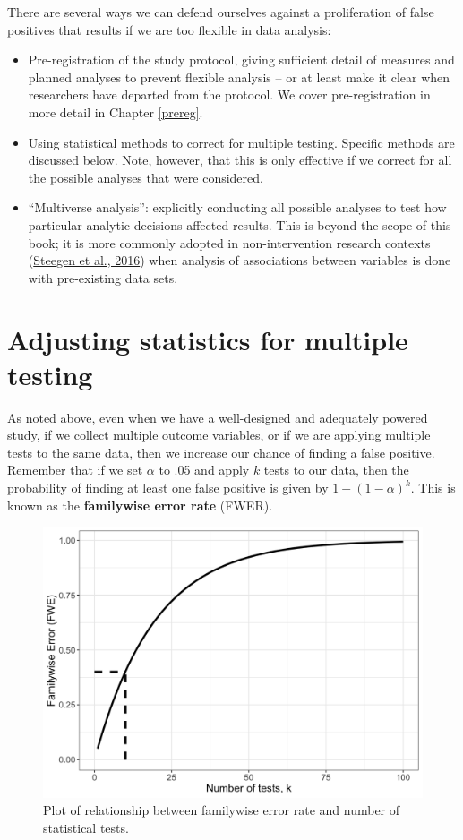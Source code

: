 \documentclass{krantz}
\begin{document}
There are several ways we can defend ourselves against a proliferation of false positives that results if we are too flexible in data analysis:

\begin{itemize}
\item
  Pre-registration of the study protocol, giving sufficient detail of measures and planned analyses to prevent flexible analysis -- or at least make it clear when researchers have departed from the protocol. We cover pre-registration in more detail in Chapter \ref{prereg}.
\item
  Using statistical methods to correct for multiple testing. Specific methods are discussed below. Note, however, that this is only effective if we correct for all the possible analyses that were considered.
\item
  ``Multiverse analysis'': explicitly conducting all possible analyses to test how particular analytic decisions affected results. This is beyond the scope of this book; it is more commonly adopted in non-intervention research contexts (\protect\hyperlink{ref-steegen2016}{Steegen et al., 2016}) when analysis of associations between variables is done with pre-existing data sets.
\end{itemize}

\hypertarget{adjusting-statistics-for-multiple-testing}{%
\section{Adjusting statistics for multiple testing}\label{adjusting-statistics-for-multiple-testing}}

As noted above, even when we have a well-designed and adequately powered study, if we collect multiple outcome variables, or if we are applying multiple tests to the same data, then we increase our chance of finding a false positive. Remember that if we set \(\alpha\) to .05 and apply \(k\) tests to our data, then the probability of finding at least one false positive is given by \(1-(1-\alpha)^{k}\). This is known as the \textbf{familywise error rate} (FWER).

\begin{figure}
\includegraphics[width=0.8\linewidth]{images_bw/familywise} \caption{Plot of relationship between familywise error rate and number of statistical tests.}\label{fig:familywise}
\end{figure}
\end{document}

